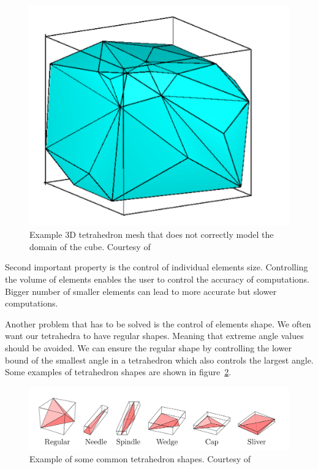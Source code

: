 \documentclass[en]{minipw} %
\begin{document}
\begin{figure}[h!]
\centering
\includegraphics[scale=0.5]{pictures/3dmesh_incomplite.png}
\caption[Poor 3D mesh]{Example 3D tetrahedron mesh that does not correctly model the domain of the cube. Courtesy of~\cite{delaunay_mesh}}
\label{fig:mesh_incomplete}
\end{figure}

Second important property is the control of individual elements size. Controlling the volume of elements enables the user to control the accuracy of computations. Bigger number of smaller elements can lead to more accurate but slower computations.

Another problem that has to be solved is the control of elements shape. We often want our tetrahedra to have regular shapes. Meaning that extreme angle values should be avoided. We can ensure the regular shape by controlling the lower bound of the smallest angle in a tetrahedron which also controls the largest angle. Some examples of tetrahedron shapes are shown in figure~\ref{fig:tetrahedra_shapes}.

\begin{figure}[h!]
\centering
\includegraphics[scale=0.3]{pictures/tetrahedra_shapes.png}
\caption[Tetrahedron shapes]{Example of some common tetrahedron shapes. Courtesy of~\cite{tetgen}}
\label{fig:tetrahedra_shapes}
\end{figure}
\end{document}
